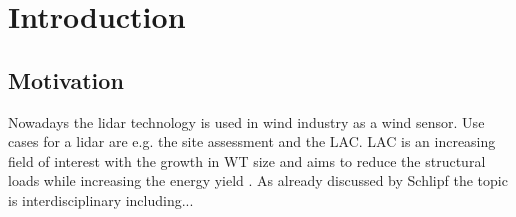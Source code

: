 \chapter{Introduction} \label{cha:INT}
\section{Motivation}\label{sec:Mot}
Nowadays the \gls{lidar} technology is used in wind industry as a wind sensor. Use cases for a \gls{lidar} are e.g. the site assessment and the \gls{LAC}. \gls{LAC} is an increasing field of interest with the growth in \gls{WT} size and aims to reduce the structural loads while increasing the energy yield \cite{SteinmannPerez2025}. As already discussed by Schlipf \cite{Schlipf2015} the topic is interdisciplinary including...